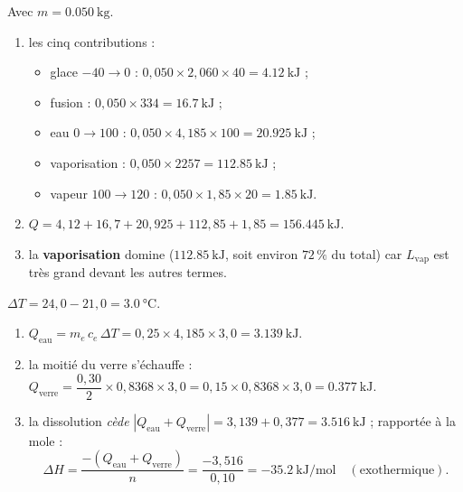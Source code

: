 \documentclass[11pt,a4paper]{article}
\begin{document}
\begin{corrige}
Avec $m=\qty{0.050}{\kilogram}$.
\begin{enumerate}[label=\alph*)]
  \item les cinq contributions :
  \begin{itemize}[leftmargin=1.4em,topsep=1pt,itemsep=1pt]
    \item glace $-40\to 0$ : $0{,}050\times 2{,}060\times 40 = \qty{4.12}{\kilo\joule}$ ;
    \item fusion : $0{,}050\times 334 = \qty{16.7}{\kilo\joule}$ ;
    \item eau $0\to 100$ : $0{,}050\times 4{,}185\times 100 = \qty{20.925}{\kilo\joule}$ ;
    \item vaporisation : $0{,}050\times 2257 = \qty{112.85}{\kilo\joule}$ ;
    \item vapeur $100\to 120$ : $0{,}050\times 1{,}85\times 20 = \qty{1.85}{\kilo\joule}$.
  \end{itemize}
  \item $Q = 4{,}12 + 16{,}7 + 20{,}925 + 112{,}85 + 1{,}85 = \qty{156.445}{\kilo\joule}$.
  \item la \textbf{vaporisation} domine ($\qty{112.85}{\kilo\joule}$, soit environ $72\,\%$ du total) car $L_{\text{vap}}$ est très grand devant les autres termes.
\end{enumerate}
\end{corrige}

\begin{corrige}
$\Delta T = 24{,}0-21{,}0 = \qty{3.0}{\celsius}$.
\begin{enumerate}[label=\alph*)]
  \item $Q_{\text{eau}} = m_e\,c_e\,\Delta T = 0{,}25\times 4{,}185\times 3{,}0 = \qty{3.139}{\kilo\joule}$.
  \item la moitié du verre s'échauffe : $Q_{\text{verre}} = \dfrac{0{,}30}{2}\times 0{,}8368\times 3{,}0 = 0{,}15\times 0{,}8368\times 3{,}0 = \qty{0.377}{\kilo\joule}$.
  \item la dissolution \emph{cède} $|Q_{\text{eau}}+Q_{\text{verre}}| = 3{,}139+0{,}377 = \qty{3.516}{\kilo\joule}$ ; rapportée à la mole :
  \[ \Delta H = \dfrac{-(Q_{\text{eau}}+Q_{\text{verre}})}{n} = \dfrac{-3{,}516}{0{,}10} = \qty{-35.2}{\kilo\joule\per\mol}\quad(\text{exothermique}). \]
\end{enumerate}
\end{corrige}
\end{document}
